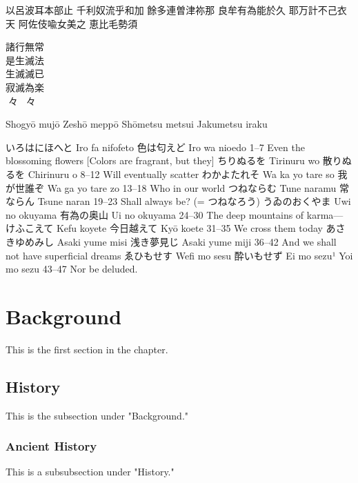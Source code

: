 \documentclass[a5paper, 10pt, openany]{book} %
\begin{document}
以呂波耳本部止
千利奴流乎和加
餘多連曽津祢那
良牟有為能於久
耶万計不己衣天
阿佐伎喩女美之
恵比毛勢須


諸行無常\\
是生滅法\\
生滅滅已\\
寂滅為楽\\

々々


Shogyō mujō
Zeshō meppō
Shōmetsu metsui
Jakumetsu iraku

いろはにほへと	Iro fa nifofeto	色は匂えど	Iro wa nioedo	1–7	Even the blossoming flowers [Colors are fragrant, but they]
ちりぬるを	Tirinuru wo	散りぬるを	Chirinuru o	8–12	Will eventually scatter
わかよたれそ	Wa ka yo tare so	我が世誰ぞ	Wa ga yo tare zo	13–18	Who in our world
つねならむ	Tune naramu	常ならん	Tsune naran	19–23	Shall always be? (= つねなろう)
うゐのおくやま	Uwi no okuyama	有為の奥山	Ui no okuyama	24–30	The deep mountains of karma—
けふこえて	Kefu koyete	今日越えて	Kyō koete	31–35	We cross them today
あさきゆめみし	Asaki yume misi	浅き夢見じ	Asaki yume miji	36–42	And we shall not have superficial dreams
ゑひもせす	Wefi mo sesu	酔いもせず	Ei mo sezu¹
Yoi mo sezu	43–47	Nor be deluded.

\section{Background}
This is the first section in the chapter.

\subsection{History}
This is the subsection under "Background."

\subsubsection{Ancient History}
This is a subsubsection under "History."
\end{document}
